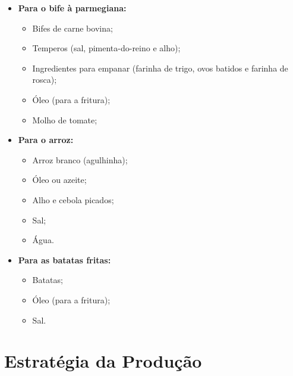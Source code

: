\documentclass[12pt, a4paper]{article}
\begin{document}
\begin{itemize}
    \item \textbf{Para o bife à parmegiana:} 
    \begin{itemize}
        \item Bifes de carne bovina;
        \item Temperos (sal, pimenta-do-reino e alho);
        \item Ingredientes para empanar (farinha de trigo, ovos batidos e farinha de rosca);
        \item Óleo (para a fritura);
        \item Molho de tomate;
    \end{itemize}
    
    \item \textbf{Para o arroz:}
    \begin{itemize}
        \item Arroz branco (agulhinha);
        \item Óleo ou azeite;
        \item Alho e cebola picados;
        \item Sal;
        \item Água.
    \end{itemize}
    
    \item \textbf{Para as batatas fritas:}
    \begin{itemize}
        \item Batatas;
        \item Óleo (para a fritura);
        \item Sal.
    \end{itemize}
\end{itemize}


\section{Estratégia da Produção}

%
%
%



\end{document}
